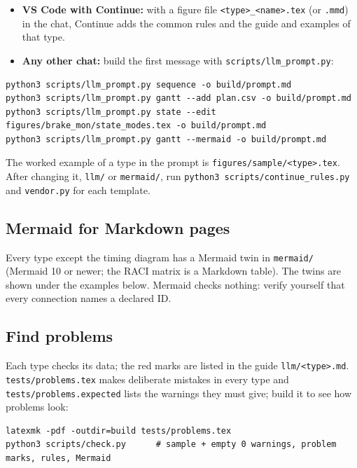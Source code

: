 \begin{itemize}
  \item \textbf{VS Code with Continue:} with a figure file \texttt{<type>_<name>.tex} (or \texttt{.mmd}) in the chat, Continue adds the common rules and the guide and examples of that type.
  \item \textbf{Any other chat:} build the first message with \texttt{scripts/llm_prompt.py}:
\end{itemize}

\begin{Verbatim}[frame=single]
python3 scripts/llm_prompt.py sequence -o build/prompt.md
python3 scripts/llm_prompt.py gantt --add plan.csv -o build/prompt.md
python3 scripts/llm_prompt.py state --edit figures/brake_mon/state_modes.tex -o build/prompt.md
python3 scripts/llm_prompt.py gantt --mermaid -o build/prompt.md
\end{Verbatim}

The worked example of a type in the prompt is \texttt{figures/sample/<type>.tex}. After changing it, \texttt{llm/} or \texttt{mermaid/}, run \texttt{python3 scripts/continue_rules.py} and \texttt{vendor.py} for each template.

\subsection{Mermaid for Markdown pages}

Every type except the timing diagram has a Mermaid twin in \texttt{mermaid/} (Mermaid 10 or newer; the RACI matrix is a Markdown table). The twins are shown under the examples below. Mermaid checks nothing: verify yourself that every connection names a declared ID.

\subsection{Find problems}

Each type checks its data; the red marks are listed in the guide \texttt{llm/<type>.md}. \texttt{tests/problems.tex} makes deliberate mistakes in every type and \texttt{tests/problems.expected} lists the warnings they must give; build it to see how problems look:

\begin{Verbatim}[frame=single]
latexmk -pdf -outdir=build tests/problems.tex
python3 scripts/check.py      # sample + empty 0 warnings, problem marks, rules, Mermaid
\end{Verbatim}

